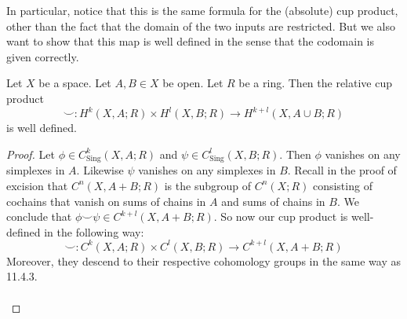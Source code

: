 \documentclass[a4paper]{article}
\begin{document}
In particular, notice that this is the same formula for the (absolute) cup product, other than the fact that the domain of the two inputs are restricted. But we also want to show that this map is well defined in the sense that the codomain is given correctly. 

\begin{lmm}{}{} Let $X$ be a space. Let $A,B\in X$ be open. Let $R$ be a ring. Then the relative cup product $$\smile:H^k(X,A;R)\times H^l(X,B;R)\to H^{k+l}(X,A\cup B;R)$$ is well defined. \tcbline
\begin{proof}
Let $\phi\in C_\text{Sing}^k(X,A;R)$ and $\psi\in C_\text{Sing}^l(X,B;R)$. Then $\phi$ vanishes on any simplexes in $A$. Likewise $\psi$ vanishes on any simplexes in $B$. Recall in the proof of excision that $C^n(X,A+B;R)$ is the subgroup of $C^n(X;R)$ consisting of cochains that vanish on sums of chains in $A$ and sums of chains in $B$. We conclude that $\phi\smile\psi\in C^{k+l}(X,A+B;R)$. So now our cup product is well-defined in the following way: $$\smile:C^k(X,A;R)\times C^l(X,B;R)\to C^{k+l}(X,A+B;R)$$ Moreover, they descend to their respective cohomology groups in the same way as 11.4.3. \\~\\


\end{proof}
\end{lmm}
\end{document}
